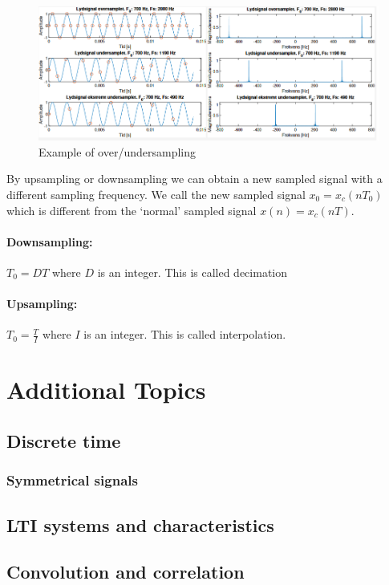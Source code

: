 \documentclass{article}
\begin{document}
\begin{figure}[h!]
    \centering
    \includegraphics[width=1\textwidth]{figures/Sampling and reconstruction/sampling_examples.png}
    \caption{Example of over/undersampling}
    \label{fig:sampling_example}
\end{figure}

 By upsampling or downsampling we can obtain a new sampled signal with a different sampling frequency.
 We call the new sampled signal $x_0 = x_c(nT_0)$ which is different from the `normal' sampled signal $x(n) = x_c(nT)$.

\paragraph{Downsampling:} $T_0 = DT$ where $D$ is an integer. This is called decimation

\paragraph{Upsampling:} $T_0 = \frac{T}{I}$ where $I$ is an integer. This is called interpolation.
\section{Additional Topics}
\subsection{Discrete time}
\subsubsection{Symmetrical signals}

\subsection{LTI systems and characteristics}

\subsection{Convolution and correlation}
\end{document}
